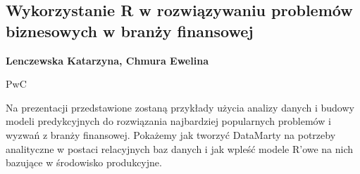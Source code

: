 \documentclass[\main/boa.tex]{subfiles}
\begin{document}
\subsection{Wykorzystanie R w rozwiązywaniu problemów biznesowych w branży finansowej}

\begin{minipage}{0.915\textwidth}
	\centering
  {\bf {} Lenczewska Katarzyna,  Chmura Ewelina}
\end{minipage}


\begin{affiliations}
\begin{minipage}{0.915\textwidth}
\centering
PwC \\[-2pt]
\end{minipage}
\end{affiliations}

\vskip 0.3cm

  Na prezentacji przedstawione zostaną przykłady użycia analizy danych i budowy modeli predykcyjnych do rozwiązania najbardziej popularnych problemów i wyzwań z branży finansowej. Pokażemy jak tworzyć DataMarty na potrzeby analityczne w postaci relacyjnych baz danych i jak wpleść modele R'owe na nich bazujące w środowisko produkcyjne. 
\end{document}
